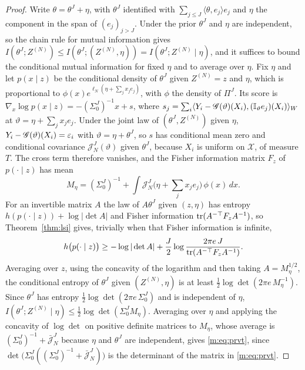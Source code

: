 \begin{proof}
Write $\theta=\theta^J+\eta$, with $\theta^J$ identified with $\sum_{j\le J}\langle\theta,e_j\rangle e_j$ and $\eta$ the component in the span of $(e_j)_{j>J}$. Under the prior $\theta^J$ and $\eta$ are independent, so the chain rule for mutual information gives $I(\theta^J;Z^{(N)})\le I(\theta^J;(Z^{(N)},\eta))=I(\theta^J;Z^{(N)}\mid\eta)$, and it suffices to bound the conditional mutual information for fixed $\eta$ and to average over $\eta$. Fix $\eta$ and let $p(x\mid z)$ be the conditional density of $\theta^J$ given $Z^{(N)}=z$ and $\eta$, which is proportional to $\phi(x)e^{\ell_N(\eta+\sum_jx_je_j)}$, with $\phi$ the density of $\Pi^J$. Its score is $\nabla_x\log p(x\mid z)=-(\Sigma^J_0)^{-1}x+s$, where $s_j=\sum_i\langle Y_i-\mathscr{G}(\vartheta)(X_i),(\mathbb{I}_\vartheta e_j)(X_i)\rangle_W$ at $\vartheta=\eta+\sum_jx_je_j$. Under the joint law of $(\theta^J,Z^{(N)})$ given $\eta$, $Y_i-\mathscr{G}(\vartheta)(X_i)=\varepsilon_i$ with $\vartheta=\eta+\theta^J$, so $s$ has conditional mean zero and conditional covariance $\mathcal J^J_N(\vartheta)$ given $\theta^J$, because $X_i$ is uniform on $\mathcal X$, of measure $T$. The cross term therefore vanishes, and the Fisher information matrix $F_z$ of $p(\cdot\mid z)$ has mean
\[
M_\eta=(\Sigma^J_0)^{-1}+\int\mathcal J^J_N\big(\eta+\textstyle\sum_jx_je_j\big)\,\phi(x)\,dx .
\]
For an invertible matrix $A$ the law of $A\theta^J$ given $(z,\eta)$ has entropy $h(p(\cdot\mid z))+\log|\det A|$ and Fisher information $\mathrm{tr}(A^{-\top}F_zA^{-1})$, so Theorem~\ref{thm:lsi} gives, trivially when that Fisher information is infinite,
\[
h\big(p(\cdot\mid z)\big)\ge-\log|\det A|+\frac J2\log\frac{2\pi e\,J}{\mathrm{tr}(A^{-\top}F_zA^{-1})} .
\]
Averaging over $z$, using the concavity of the logarithm and then taking $A=M_\eta^{1/2}$, the conditional entropy of $\theta^J$ given $(Z^{(N)},\eta)$ is at least $\tfrac12\log\det(2\pi e\,M_\eta^{-1})$. Since $\theta^J$ has entropy $\tfrac12\log\det(2\pi e\,\Sigma^J_0)$ and is independent of $\eta$, $I(\theta^J;Z^{(N)}\mid\eta)\le\tfrac12\log\det(\Sigma^J_0M_\eta)$. Averaging over $\eta$ and applying the concavity of $\log\det$ on positive definite matrices to $M_\eta$, whose average is $(\Sigma^J_0)^{-1}+\bar{\mathcal J}^J_N$ because $\eta$ and $\theta^J$ are independent, gives \eqref{m:eq:prvt}, since $\det\big(\Sigma^J_0((\Sigma^J_0)^{-1}+\bar{\mathcal J}^J_N)\big)$ is the determinant of the matrix in \eqref{m:eq:prvt}.


\end{proof}

